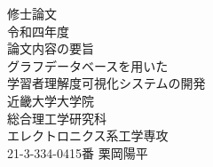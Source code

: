 \begin{titlepage}
\begin{center}
\vspace*{1cm}
\Large
{\Huge 修\hspace{2zw}士\hspace{2zw}論\hspace{2zw}文}\\
\vspace*{1cm}
{\huge 令和四年度}\\
\vspace*{2cm}
{\huge 論文内容の要旨}\\
\vspace*{1cm}
{\LARGE グラフデータベースを用いた\\
学習者理解度可視化システムの開発
}\\
\vspace*{7cm}
\LARGE{近畿大学大学院\\
総合理工学研究科\\
エレクトロニクス系工学専攻\\
21-3-334-0415番 \hspace{0.5zw} 栗\hspace{0.5zw}岡\hspace{0.5zw}陽\hspace{0.5zw}平
}
\end{center}
\end{titlepage}

\newpage

